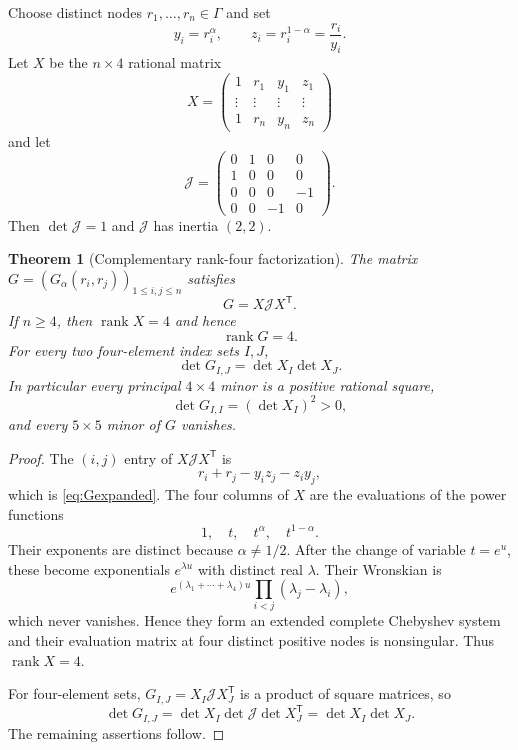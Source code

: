 \documentclass[11pt]{article}
\newtheorem{theorem}{Theorem}[section]
\theoremstyle{definition}
\theoremstyle{remark}
\newcommand{\rank}{\operatorname{rank}}
\begin{document}
Choose distinct nodes $r_1,\dots,r_n\in\Gamma$ and set
\begin{equation}\label{eq:xyz}
 y_i=r_i^\alpha,\qquad z_i=r_i^{1-\alpha}=\frac{r_i}{y_i}.
\end{equation}
Let $X$ be the $n\times4$ rational matrix
\begin{equation}\label{eq:Xmatrix}
 X=
 \begin{pmatrix}
  1&r_1&y_1&z_1\\
  \vdots&\vdots&\vdots&\vdots\\
  1&r_n&y_n&z_n
 \end{pmatrix}
\end{equation}
and let
\begin{equation}\label{eq:Jmatrix}
 \mathcal J=
 \begin{pmatrix}
 0&1&0&0\\
 1&0&0&0\\
 0&0&0&-1\\
 0&0&-1&0
 \end{pmatrix}.
\end{equation}
Then $\det\mathcal J=1$ and $\mathcal J$ has inertia $(2,2)$.

\begin{theorem}[Complementary rank-four factorization]\label{thm:rankfour}
The matrix $G=(G_\alpha(r_i,r_j))_{1\le i,j\le n}$ satisfies
\begin{equation}\label{eq:Gfactor}
 G=X\mathcal JX^{\mathsf T}.
\end{equation}
If $n\ge4$, then $\rank X=4$ and hence
\begin{equation}\label{eq:rankG}
 \rank G=4.
\end{equation}
For every two four-element index sets $I,J$,
\begin{equation}\label{eq:mixedminor}
 \det G_{I,J}=\det X_I\det X_J.
\end{equation}
In particular every principal $4\times4$ minor is a positive rational square,
\begin{equation}\label{eq:principal-square}
 \det G_{I,I}=(\det X_I)^2>0,
\end{equation}
and every $5\times5$ minor of $G$ vanishes.
\end{theorem}

\begin{proof}
The $(i,j)$ entry of $X\mathcal JX^{\mathsf T}$ is
\[
 r_i+r_j-y_iz_j-z_iy_j,
\]
which is \eqref{eq:Gexpanded}.  The four columns of $X$ are the evaluations of the power functions
\[
 1,\quad t,\quad t^\alpha,\quad t^{1-\alpha}.
\]
Their exponents are distinct because $\alpha\ne1/2$.  After the change of variable $t=e^u$, these become exponentials $e^{\lambda u}$ with distinct real $\lambda$.  Their Wronskian is
\[
 e^{(\lambda_1+\cdots+\lambda_4)u}
 \prod_{i<j}(\lambda_j-\lambda_i),
\]
which never vanishes.  Hence they form an extended complete Chebyshev system and their evaluation matrix at four distinct positive nodes is nonsingular.  Thus $\rank X=4$.

For four-element sets, $G_{I,J}=X_I\mathcal JX_J^{\mathsf T}$ is a product of square matrices, so
\[
 \det G_{I,J}=\det X_I\det\mathcal J\det X_J^{\mathsf T}
 =\det X_I\det X_J.
\]
The remaining assertions follow.
\end{proof}
\end{document}
